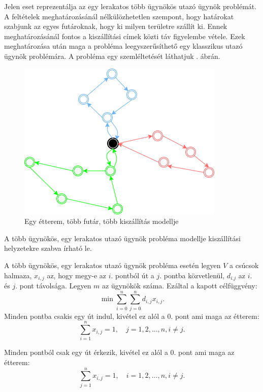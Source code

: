 

Jelen eset reprezentálja az egy lerakatos több ügynökös utazó ügynök problémát. A feltételek meghatározásánál nélkülözhetetlen szempont, hogy határokat szabjunk az egyes futároknak, hogy ki milyen területre szállít ki. Ennek meghatározásánál fontos a kiszállítási címek közti táv figyelembe vétele. Ezek meghatározása után maga a probléma leegyszerűsíthető egy klasszikus utazó ügynök problémára.
A probléma egy szemléltetését láthatjuk . ábrán.\cite{Diagrams.net}

\begin{figure}[h!]
\centering
\includegraphics[scale=0.7]{images/Onedepotmtsp.png}
\caption{Egy étterem, több futár, több kiszállítás modellje}
\label{fig:model4}
\end{figure}


A több ügynökös, egy lerakatos utazó ügynök probléma modellje kiszállítási helyzetekre szabva írható le.

A több ügynökös, egy lerakatos utazó ügynök probléma esetén legyen $V$ a csúcsok halmaza, $x_{i,j}$ az, hogy megy-e az $i.$ pontból út a $j.$ pontba közvetlenül, $d_{i.j}$ az $i.$ és $j.$ pont távolsága. Legyen $m$ az ügynökök száma. Ezáltal a kapott célfüggvény: \cite{MTSP}
\[
\displaystyle
\min \sum_{i=0}^n \sum_{j=0}^n d_{i,j} x_{i,j}.
\]
Minden pontba csakis egy út indul, kivétel ez alól a 0. pont ami maga az étterem:
\[
\displaystyle
\sum_{i=1}^n x_{i,j} = 1, \quad j = 1, 2, \ldots, n, i \neq j.
\]

Minden pontból csak egy út érkezik, kivétel ez alól a 0. pont ami maga az étterem:
\[
\displaystyle
\sum_{j=1}^n x_{i,j} = 1, \quad i = 1, 2, \ldots, n, i \neq j.
\]

